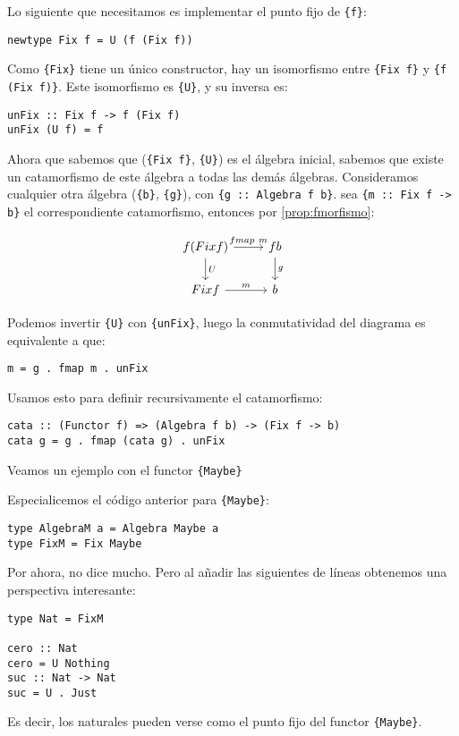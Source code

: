 \documentclass[12pt, twoside]{book}
\newcommand{\code}[1]{\Verb+{#1}+}
\begin{document}
Lo siguiente que necesitamos es implementar el punto fijo de \code{f}:
\begin{verbatim}
newtype Fix f = U (f (Fix f))
\end{verbatim}
Como \code{Fix} tiene un único constructor, hay un isomorfismo entre \code{Fix f} y \code{f (Fix f)}.
Este isomorfismo es \code{U}, y su inversa es:
\begin{verbatim}
unFix :: Fix f -> f (Fix f)
unFix (U f) = f
\end{verbatim}

Ahora que sabemos que (\code{Fix f}, \code{U}) es el álgebra inicial, sabemos que existe un catamorfismo de este álgebra a todas las demás álgebras.
Consideramos cualquier otra álgebra (\code{b}, \code{g}), con \code{g :: Algebra f b}. sea \code{m :: Fix f -> b} el correspondiente catamorfismo, entonces por \ref{prop:fmorfismo}:

\[
\begin{tikzcd}
{f (Fix f)} \arrow[r,"fmap\ m"] \arrow[d,"U"] & f b \arrow[d,"g"]\\
{Fix f} \arrow[r,"m"] & b
\end{tikzcd}
\]

Podemos invertir \code{U} con \code{unFix}, luego la conmutatividad del diagrama es equivalente a que:
\begin{verbatim}
m = g . fmap m . unFix
\end{verbatim}
Usamos esto para definir recursivamente el catamorfismo:
\begin{verbatim}
cata :: (Functor f) => (Algebra f b) -> (Fix f -> b)
cata g = g . fmap (cata g) . unFix
\end{verbatim}

Veamos un ejemplo con el functor \code{Maybe}
\begin{example}
Especialicemos el código anterior para \code{Maybe}:
\begin{verbatim}
type AlgebraM a = Algebra Maybe a
type FixM = Fix Maybe
\end{verbatim}
Por ahora, no dice mucho. Pero al añadir las siguientes de líneas obtenemos una perspectiva interesante:
\begin{verbatim}
type Nat = FixM

cero :: Nat
cero = U Nothing
suc :: Nat -> Nat
suc = U . Just
\end{verbatim}
Es decir, los naturales pueden verse como el punto fijo del functor \code{Maybe}.
\end{example}

\backmatter



\end{document}

